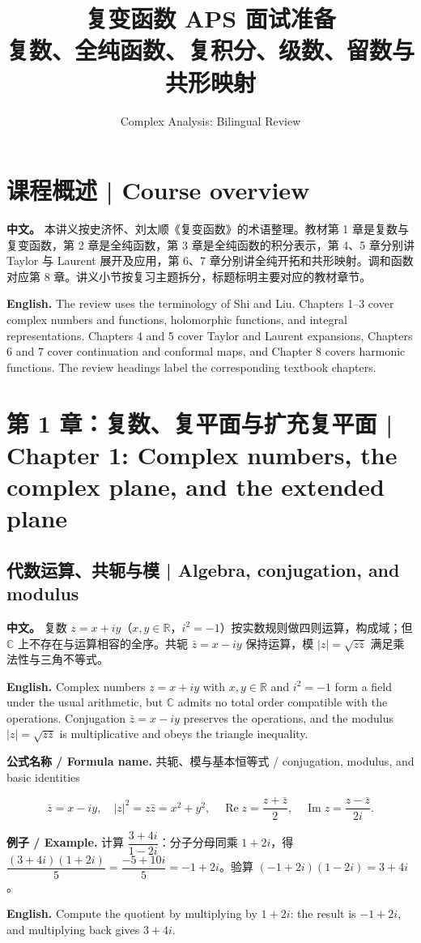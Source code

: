 \documentclass[UTF8,11pt,a4paper]{ctexart}
\title{复变函数 APS 面试准备\\[4pt]\large 复数、全纯函数、复积分、级数、留数与共形映射}
\author{Complex Analysis: Bilingual Review}
\date{}
\newcommand{\EN}[1]{\par\noindent \textbf{English.} #1\par}
\newcommand{\FORMULA}[2]{\par\noindent\textbf{公式名称 / Formula name.} #1 / #2\par}
\newcommand{\EX}[2]{\par\noindent \textbf{例子 / Example.} #1\par\EN{#2}}
\newcommand{\APS}[2]{\par\noindent\textbf{中文。} #1\par\noindent\textbf{English.} #2\par\smallskip}
\begin{document}
\maketitle

\section*{课程概述 | Course overview}
\APS{本讲义按史济怀、刘太顺《复变函数》的术语整理。教材第 1 章是复数与复变函数，第 2 章是全纯函数，第 3 章是全纯函数的积分表示，第 4、5 章分别讲 Taylor 与 Laurent 展开及应用，第 6、7 章分别讲全纯开拓和共形映射。调和函数对应第 8 章。讲义小节按复习主题拆分，标题标明主要对应的教材章节。}{The review uses the terminology of Shi and Liu. Chapters 1--3 cover complex numbers and functions, holomorphic functions, and integral representations. Chapters 4 and 5 cover Taylor and Laurent expansions, Chapters 6 and 7 cover continuation and conformal maps, and Chapter 8 covers harmonic functions. The review headings label the corresponding textbook chapters.}

\section[第 1 章 复数与复平面]{第 1 章：复数、复平面与扩充复平面 | Chapter 1: Complex numbers, the complex plane, and the extended plane}

\subsection{代数运算、共轭与模 | Algebra, conjugation, and modulus}
\APS{复数 $z=x+iy$（$x,y\in\mathbb R$，$i^2=-1$）按实数规则做四则运算，构成域；但 $\mathbb C$ 上不存在与运算相容的全序。共轭 $\bar z=x-iy$ 保持运算，模 $|z|=\sqrt{z\bar z}$ 满足乘法性与三角不等式。}{Complex numbers $z=x+iy$ with $x,y\in\mathbb R$ and $i^2=-1$ form a field under the usual arithmetic, but $\mathbb C$ admits no total order compatible with the operations. Conjugation $\bar z=x-iy$ preserves the operations, and the modulus $|z|=\sqrt{z\bar z}$ is multiplicative and obeys the triangle inequality.}
\FORMULA{共轭、模与基本恒等式}{conjugation, modulus, and basic identities}
\[
\bar z=x-iy,\quad |z|^2=z\bar z=x^2+y^2,\quad
\operatorname{Re}z=\frac{z+\bar z}{2},\quad \operatorname{Im}z=\frac{z-\bar z}{2i}.
\]
\EX{计算 $\dfrac{3+4i}{1-2i}$：分子分母同乘 $1+2i$，得 $\dfrac{(3+4i)(1+2i)}{5}=\dfrac{-5+10i}{5}=-1+2i$。验算 $(-1+2i)(1-2i)=3+4i$。}{Compute the quotient by multiplying by $1+2i$: the result is $-1+2i$, and multiplying back gives $3+4i$.}
\end{document}
